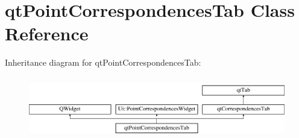 \hypertarget{classqt_point_correspondences_tab}{}\section{qt\+Point\+Correspondences\+Tab Class Reference}
\label{classqt_point_correspondences_tab}
Inheritance diagram for qt\+Point\+Correspondences\+Tab\+:\begin{figure}[H]
\begin{center}
\leavevmode
\includegraphics[height=2.745098cm]{classqt_point_correspondences_tab}
\end{center}
\end{figure}
